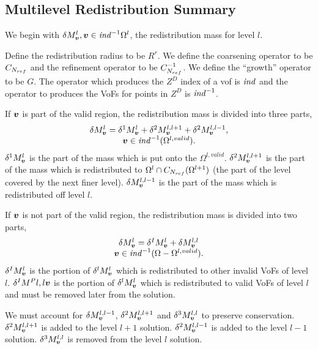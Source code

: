 \subsection{Multilevel Redistribution Summary}

We begin with $\delta
M^l_{\boldsymbol{v}}, {\boldsymbol{v}} \in {\it ind}^{-1} \Omega^l$, the redistribution
mass for level $l$. 

Define the redistribution radius to be $R^r$.  We define the 
coarsening operator to be $C_{{{N}_{ref}}}$ and the refinement
operator to be $C^{-1}_{{{N}_{ref}}}$.  We define the ``growth''
operator to be $G$.  The operator which produces the $Z^D$
index of a vof is ${\it ind}$ and the operator to produces the 
VoFs for points in $Z^D$ is ${\it ind}^{-1}$.  

If ${\boldsymbol{v}}$ is part of the valid region, 
the redistribution mass is divided into three parts,
\begin{equation}
\begin{array}{c}
 \delta M^l_{\boldsymbol{v}} = \delta^1 M^l_{\boldsymbol{v}} +  
\delta^2 M^{l,l+1}_{\boldsymbol{v}} +  \delta^2 M^{l,l-1}_{\boldsymbol{v}}, \\
{\boldsymbol{v}} \in {\it ind}^{-1}(\Omega^{l, valid}).
\end{array}
\end{equation}
$\delta^1 M^l_{\boldsymbol{v}}$ is the part of the mass which is put onto the
$\Omega^{l, valid}$. $\delta^2 M^{l,l+1}_{\boldsymbol{v}}$ is the part of the
mass which is redistributed to $\Omega^l \cap C_{{{N}_{ref}}}(\Omega^{l+1})$
(the part of the level covered by the next finer level).
$\delta M^{l,l-1}_{\boldsymbol{v}}$ is the part of the mass which is
redistributed off level $l$.  

If ${\boldsymbol{v}}$ is not part of the valid region, 
the redistribution mass is divided into two parts,
\begin{equation}
\begin{array}{c}
 \delta M^l_{\boldsymbol{v}} = \delta^I M^l_{\boldsymbol{v}} + \delta M^{l,l}_{\boldsymbol{v}} \\
{\boldsymbol{v}} \in {\it ind}^{-1}(\Omega - \Omega^{l, valid}).
\end{array}
\end{equation}
$\delta^I M^l_{\boldsymbol{v}}$ is the portion of $\delta^l M^l_{\boldsymbol{v}}$ which
is redistributed to other invalid VoFs of level $l$.
$\delta^I M^P{l,l}{\boldsymbol{v}}$ is the portion of $\delta^l M^l_{\boldsymbol{v}}$ which
is redistributed to valid VoFs of level $l$ and must be removed
later from the solution.

We must account for $\delta M^{l,l-1}_{\boldsymbol{v}}$,
$\delta^2 M^{l,l+1}_{\boldsymbol{v}}$ and $\delta^3 M^{l,l}_{\boldsymbol{v}}$ 
to preserve conservation. $\delta^2 M^{l,l+1}_{\boldsymbol{v}}$ is 
added to the level $l+1$ solution.  $\delta^2 M^{l,l-1}_{\boldsymbol{v}}$ is 
added to the level $l-1$ solution. $\delta^3 M^{l,l}_{\boldsymbol{v}}$ 
is removed from the level $l$ solution.  

